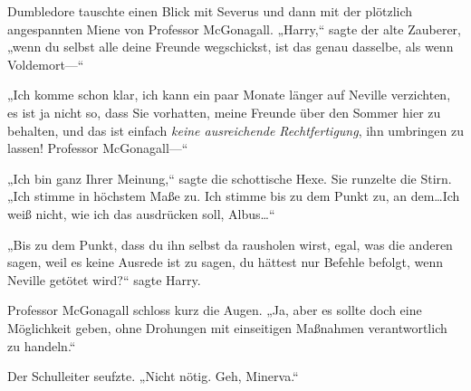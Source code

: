 Dumbledore tauschte einen Blick mit Severus und dann mit der plötzlich angespannten Miene von Professor McGonagall.
„Harry,“ sagte der alte Zauberer, „wenn du selbst alle deine Freunde wegschickst, ist das genau dasselbe, als wenn Voldemort—“

„Ich komme schon klar, ich kann ein paar Monate länger auf Neville verzichten, es ist ja nicht so, dass Sie vorhatten, meine Freunde über den Sommer hier zu behalten, und das ist einfach \emph{keine ausreichende Rechtfertigung}, ihn umbringen zu lassen! Professor McGonagall—“

„Ich bin ganz Ihrer Meinung,“ sagte die schottische Hexe.
Sie runzelte die Stirn. „Ich stimme in höchstem Maße zu. Ich stimme bis zu dem Punkt zu, an dem…Ich weiß nicht, wie ich das ausdrücken soll, Albus…“

„Bis zu dem Punkt, dass du ihn selbst da rausholen wirst, egal, was die anderen sagen, weil es keine Ausrede ist zu sagen, du hättest nur Befehle befolgt, wenn Neville getötet wird?“ sagte Harry.

Professor McGonagall schloss kurz die Augen. „Ja, aber es sollte doch eine Möglichkeit geben, ohne Drohungen mit einseitigen Maßnahmen verantwortlich zu handeln.“

Der Schulleiter seufzte.
„Nicht nötig. Geh, Minerva.“

